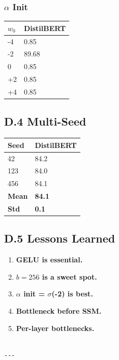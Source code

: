 \subsubsection{$\alpha$ Init}

\begin{table}[H]
\centering
\small
\begin{tabular}{ll}
\toprule
\textbf{$w_0$} & \textbf{DistilBERT} \\
\midrule
-4 & 0.85 \\
-2 & 89.68 \\
0 & 0.85 \\
+2 & 0.85 \\
+4 & 0.85 \\
\bottomrule
\end{tabular}
\end{table}

\subsection{D.4 Multi-Seed}

\begin{table}[H]
\centering
\small
\begin{tabular}{ll}
\toprule
\textbf{Seed} & \textbf{DistilBERT} \\
\midrule
42 & 84.2 \\
123 & 84.0 \\
456 & 84.1 \\
\textbf{Mean} & \textbf{84.1} \\
\textbf{Std} & \textbf{0.1} \\
\bottomrule
\end{tabular}
\end{table}

\subsection{D.5 Lessons Learned}

\begin{enumerate}
\item \textbf{GELU is essential.}
\item \textbf{$b = 256$ is a sweet spot.}
\item \textbf{$\alpha$ init = $\sigma$(-2) is best.}
\item \textbf{Bottleneck before SSM.}
\item \textbf{Per-layer bottlenecks.}
\end{enumerate}
\begin{lstlisting}

---
\end{lstlisting}